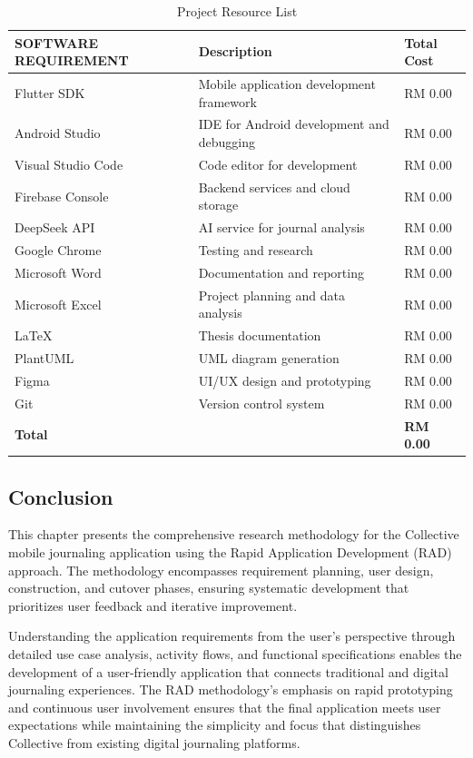 \begin{table}[H]
\centering
\caption{Project Resource List}
\label{tab:resource-list}
\begin{tabular}{|p{3.5cm}|p{6cm}|p{3.5cm}|}
\hline
\textbf{SOFTWARE REQUIREMENT} & \textbf{Description} & \textbf{Total Cost} \\
\hline
Flutter SDK & Mobile application development framework & RM 0.00 \\
\hline
Android Studio & IDE for Android development and debugging & RM 0.00 \\
\hline
Visual Studio Code & Code editor for development & RM 0.00 \\
\hline
Firebase Console & Backend services and cloud storage & RM 0.00 \\
\hline
DeepSeek API & AI service for journal analysis & RM 0.00 \\
\hline
Google Chrome & Testing and research & RM 0.00 \\
\hline
Microsoft Word & Documentation and reporting & RM 0.00 \\
\hline
Microsoft Excel & Project planning and data analysis & RM 0.00 \\
\hline
LaTeX & Thesis documentation & RM 0.00 \\
\hline
PlantUML & UML diagram generation & RM 0.00 \\
\hline
Figma & UI/UX design and prototyping & RM 0.00 \\
\hline
Git & Version control system & RM 0.00 \\
\hline
\textbf{Total} & & \textbf{RM 0.00} \\
\hline
\end{tabular}
\end{table}

\subsection{Conclusion}\label{subsec:methodologyConclusion}

This chapter presents the comprehensive research methodology for the Collective mobile journaling application using the Rapid Application Development (RAD) approach. The methodology encompasses requirement planning, user design, construction, and cutover phases, ensuring systematic development that prioritizes user feedback and iterative improvement.

Understanding the application requirements from the user's perspective through detailed use case analysis, activity flows, and functional specifications enables the development of a user-friendly application that connects traditional and digital journaling experiences. The RAD methodology's emphasis on rapid prototyping and continuous user involvement ensures that the final application meets user expectations while maintaining the simplicity and focus that distinguishes Collective from existing digital journaling platforms.
